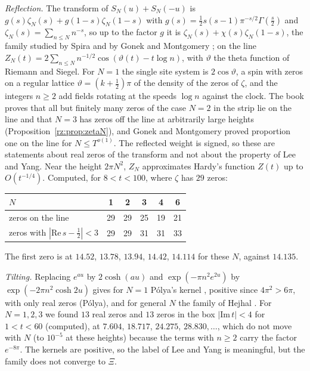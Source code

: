 \emph{Reflection.} The transform of $S_N(u)+S_N(-u)$ is $g(s)\zeta_N(s)+g(1-s)\zeta_N(1-s)$ with $g(s)=\frac12s(s-1)\pi^{-s/2}\Gamma(\frac s2)$ and $\zeta_N(s)=\sum_{n\le N}n^{-s}$, so up to the factor $g$ it is $\zeta_N(s)+\chi(s)\zeta_N(1-s)$, the family studied by Spira \cite[Section 6]{Spira67} and by Gonek and Montgomery \cite{GonekMontgomery13}; on the line $Z_N(t)=2\sum_{n\le N}n^{-1/2}\cos(\vartheta(t)-t\log n)$, with $\vartheta$ the theta function of Riemann and Siegel. For $N=1$ the single site system is $2\cos\vartheta$, a spin with zeros on a regular lattice $\vartheta=(k+\frac12)\pi$ of the density of the zeros of $\zeta$, and the integers $n\ge2$ add fields rotating at the speeds $\log n$ against the clock. The book proves that all but finitely many zeros of the case $N=2$ in the strip lie on the line and that $N=3$ has zeros off the line at arbitrarily large heights (Proposition~\ref{rz:prop:zetaN}), and Gonek and Montgomery proved proportion one on the line for $N\le T^{o(1)}$. The reflected weight is signed, so these are statements about real zeros of the transform and not about the property of Lee and Yang. Near the height $2\pi N^2$, $Z_N$ approximates Hardy's function $Z(t)$ up to $O(t^{-1/4})$. Computed, for $8<t<100$, where $\zeta$ has $29$ zeros:
\begin{center}
\small
\begin{tabular}{lccccc}
\hline
$N$ & 1 & 2 & 3 & 4 & 6\\
\hline
zeros on the line & 29 & 29 & 25 & 19 & 21\\
zeros with $|\mathrm{Re}\,s-\frac12|<3$ & 29 & 29 & 31 & 31 & 33\\
\hline
\end{tabular}
\end{center}
The first zero is at $14.52$, $13.78$, $13.94$, $14.42$, $14.114$ for these $N$, against $14.135$.

\emph{Tilting.} Replacing $e^{au}$ by $2\cosh(au)$ and $\exp(-\pi n^2e^{2u})$ by $\exp(-2\pi n^2\cosh2u)$ gives for $N=1$ P\'olya's kernel \cite{Polya}, positive since $4\pi^2>6\pi$, with only real zeros (P\'olya), and for general $N$ the family of Hejhal \cite{Hejhal90}. For $N=1,2,3$ we found $13$ real zeros and $13$ zeros in the box $|\mathrm{Im}\,t|<4$ for $1<t<60$ (computed), at $7.604$, $18.717$, $24.275$, $28.830,\dots$, which do not move with $N$ (to $10^{-5}$ at these heights) because the terms with $n\ge2$ carry the factor $e^{-8\pi}$. The kernels are positive, so the label of Lee and Yang is meaningful, but the family does not converge to $\Xi$.

